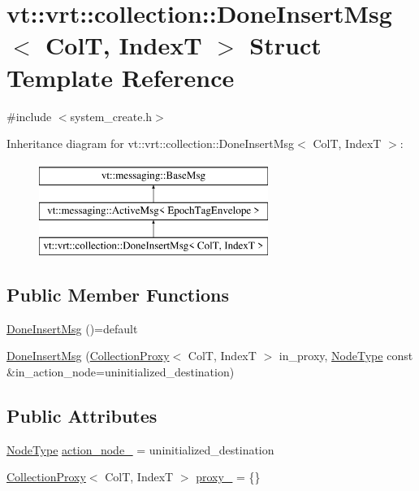 \hypertarget{structvt_1_1vrt_1_1collection_1_1_done_insert_msg}{}\section{vt\+:\+:vrt\+:\+:collection\+:\+:Done\+Insert\+Msg$<$ ColT, IndexT $>$ Struct Template Reference}
\label{structvt_1_1vrt_1_1collection_1_1_done_insert_msg}


{\ttfamily \#include $<$system\+\_\+create.\+h$>$}

Inheritance diagram for vt\+:\+:vrt\+:\+:collection\+:\+:Done\+Insert\+Msg$<$ ColT, IndexT $>$\+:\begin{figure}[H]
\begin{center}
\leavevmode
\includegraphics[height=3.000000cm]{structvt_1_1vrt_1_1collection_1_1_done_insert_msg}
\end{center}
\end{figure}
\subsection*{Public Member Functions}
\begin{DoxyCompactItemize}
\item 
\hyperlink{structvt_1_1vrt_1_1collection_1_1_done_insert_msg_a74e87cb9d8c83b77960b544e61cee9ef}{Done\+Insert\+Msg} ()=default
\item 
\hyperlink{structvt_1_1vrt_1_1collection_1_1_done_insert_msg_add6d51da4d2b2e79624fb8f153d1cea4}{Done\+Insert\+Msg} (\hyperlink{structvt_1_1vrt_1_1collection_1_1_collection_proxy}{Collection\+Proxy}$<$ ColT, IndexT $>$ in\+\_\+proxy, \hyperlink{namespacevt_a866da9d0efc19c0a1ce79e9e492f47e2}{Node\+Type} const \&in\+\_\+action\+\_\+node=uninitialized\+\_\+destination)
\end{DoxyCompactItemize}
\subsection*{Public Attributes}
\begin{DoxyCompactItemize}
\item 
\hyperlink{namespacevt_a866da9d0efc19c0a1ce79e9e492f47e2}{Node\+Type} \hyperlink{structvt_1_1vrt_1_1collection_1_1_done_insert_msg_a73c8173c2b8170bfd6be91491d79a0ae}{action\+\_\+node\+\_\+} = uninitialized\+\_\+destination
\item 
\hyperlink{structvt_1_1vrt_1_1collection_1_1_collection_proxy}{Collection\+Proxy}$<$ ColT, IndexT $>$ \hyperlink{structvt_1_1vrt_1_1collection_1_1_done_insert_msg_a3e434d7629ebc4bed5372d30165ef08d}{proxy\+\_\+} = \{\}
\end{DoxyCompactItemize}
